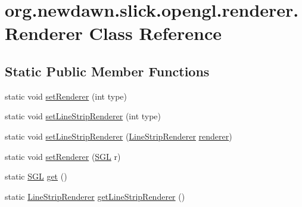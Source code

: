\hypertarget{classorg_1_1newdawn_1_1slick_1_1opengl_1_1renderer_1_1_renderer}{}\section{org.\+newdawn.\+slick.\+opengl.\+renderer.\+Renderer Class Reference}
\label{classorg_1_1newdawn_1_1slick_1_1opengl_1_1renderer_1_1_renderer}
\subsection*{Static Public Member Functions}
\begin{DoxyCompactItemize}
\item 
static void \mbox{\hyperlink{classorg_1_1newdawn_1_1slick_1_1opengl_1_1renderer_1_1_renderer_a981940daeedcefe0a84ded27f17b0fc7}{set\+Renderer}} (int type)
\item 
static void \mbox{\hyperlink{classorg_1_1newdawn_1_1slick_1_1opengl_1_1renderer_1_1_renderer_ad7172b7f319fc169ed3bbd2cab844b64}{set\+Line\+Strip\+Renderer}} (int type)
\item 
static void \mbox{\hyperlink{classorg_1_1newdawn_1_1slick_1_1opengl_1_1renderer_1_1_renderer_a7553b5b841479d2213692f05d27652a9}{set\+Line\+Strip\+Renderer}} (\mbox{\hyperlink{interfaceorg_1_1newdawn_1_1slick_1_1opengl_1_1renderer_1_1_line_strip_renderer}{Line\+Strip\+Renderer}} \mbox{\hyperlink{classorg_1_1newdawn_1_1slick_1_1opengl_1_1renderer_1_1_renderer_abe140c4ec95e1ff80b86eb12a3508713}{renderer}})
\item 
static void \mbox{\hyperlink{classorg_1_1newdawn_1_1slick_1_1opengl_1_1renderer_1_1_renderer_a88ac0b4bc09f731a3ae2cba651e4deeb}{set\+Renderer}} (\mbox{\hyperlink{interfaceorg_1_1newdawn_1_1slick_1_1opengl_1_1renderer_1_1_s_g_l}{S\+GL}} r)
\item 
static \mbox{\hyperlink{interfaceorg_1_1newdawn_1_1slick_1_1opengl_1_1renderer_1_1_s_g_l}{S\+GL}} \mbox{\hyperlink{classorg_1_1newdawn_1_1slick_1_1opengl_1_1renderer_1_1_renderer_abe742c3a7dfca67c6c01821d27087308}{get}} ()
\item 
static \mbox{\hyperlink{interfaceorg_1_1newdawn_1_1slick_1_1opengl_1_1renderer_1_1_line_strip_renderer}{Line\+Strip\+Renderer}} \mbox{\hyperlink{classorg_1_1newdawn_1_1slick_1_1opengl_1_1renderer_1_1_renderer_a8e231c62dce8d884fd0b26beed63e743}{get\+Line\+Strip\+Renderer}} ()
\end{DoxyCompactItemize}
